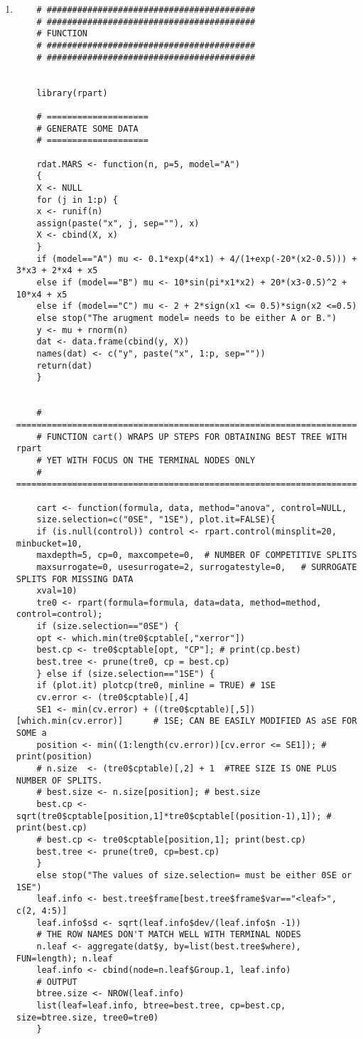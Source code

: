 \begin{enumerate}[A]
	\item \begin{verbatim}  
	# #########################################
	# #########################################
	# FUNCTION
	# #########################################
	# #########################################
	
	
	library(rpart)
	
	# ====================
	# GENERATE SOME DATA
	# ====================
	
	rdat.MARS <- function(n, p=5, model="A")
	{
	X <- NULL
	for (j in 1:p) {
	x <- runif(n)
	assign(paste("x", j, sep=""), x)
	X <- cbind(X, x)
	}
	if (model=="A") mu <- 0.1*exp(4*x1) + 4/(1+exp(-20*(x2-0.5))) + 3*x3 + 2*x4 + x5
	else if (model=="B") mu <- 10*sin(pi*x1*x2) + 20*(x3-0.5)^2 + 10*x4 + x5
	else if (model=="C") mu <- 2 + 2*sign(x1 <= 0.5)*sign(x2 <=0.5)
	else stop("The arugment model= needs to be either A or B.")
	y <- mu + rnorm(n)
	dat <- data.frame(cbind(y, X))
	names(dat) <- c("y", paste("x", 1:p, sep=""))
	return(dat)
	}
	
	
	# ===================================================================
	# FUNCTION cart() WRAPS UP STEPS FOR OBTAINING BEST TREE WITH rpart
	# YET WITH FOCUS ON THE TERMINAL NODES ONLY
	# ===================================================================
	
	cart <- function(formula, data, method="anova", control=NULL,
	size.selection=c("0SE", "1SE"), plot.it=FALSE){
	if (is.null(control)) control <- rpart.control(minsplit=20, minbucket=10, 
	maxdepth=5, cp=0, maxcompete=0,  # NUMBER OF COMPETITIVE SPLITS
	maxsurrogate=0, usesurrogate=2, surrogatestyle=0,  	# SURROGATE SPLITS FOR MISSING DATA
	xval=10)  
	tre0 <- rpart(formula=formula, data=data, method=method, control=control); 
	if (size.selection=="0SE") {
	opt <- which.min(tre0$cptable[,"xerror"])
	best.cp <- tre0$cptable[opt, "CP"]; # print(cp.best) 
	best.tree <- prune(tre0, cp = best.cp)
	} else if (size.selection=="1SE") {
	if (plot.it) plotcp(tre0, minline = TRUE) # 1SE
	cv.error <- (tre0$cptable)[,4]
	SE1 <- min(cv.error) + ((tre0$cptable)[,5])[which.min(cv.error)]      # 1SE; CAN BE EASILY MODIFIED AS aSE FOR SOME a
	position <- min((1:length(cv.error))[cv.error <= SE1]); # print(position)
	# n.size  <- (tre0$cptable)[,2] + 1  #TREE SIZE IS ONE PLUS NUMBER OF SPLITS. 
	# best.size <- n.size[position]; # best.size
	best.cp <-  sqrt(tre0$cptable[position,1]*tre0$cptable[(position-1),1]); # print(best.cp)
	# best.cp <- tre0$cptable[position,1]; print(best.cp)
	best.tree <- prune(tre0, cp=best.cp)
	}
	else stop("The values of size.selection= must be either 0SE or 1SE")
	leaf.info <- best.tree$frame[best.tree$frame$var=="<leaf>", c(2, 4:5)]
	leaf.info$sd <- sqrt(leaf.info$dev/(leaf.info$n -1))
	# THE ROW NAMES DON'T MATCH WELL WITH TERMINAL NODES 
	n.leaf <- aggregate(dat$y, by=list(best.tree$where), FUN=length); n.leaf
	leaf.info <- cbind(node=n.leaf$Group.1, leaf.info)
	# OUTPUT
	btree.size <- NROW(leaf.info)
	list(leaf=leaf.info, btree=best.tree, cp=best.cp, size=btree.size, tree0=tre0)
	}
	

\end{verbatim}
\end{enumerate}
